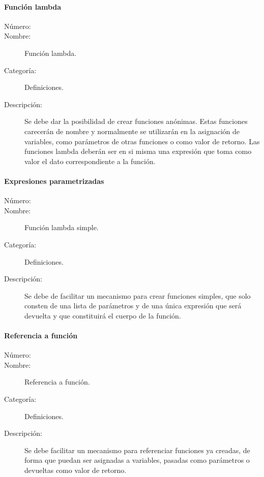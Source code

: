 \paragraph{Función lambda}
	\begin{description}
		\item [Número:] \cn
		\item [Nombre:] Función lambda.
		\item [Categoría:] Definiciones.
		\item [Descripción:] Se debe dar la posibilidad de crear funciones anónimas. Estas funciones carecerán de nombre y 
		normalmente se utilizarán en la asignación de variables, como parámetros de otras funciones o como valor de retorno. 
		Las funciones lambda deberán ser en si misma una expresión que toma como valor el dato correspondiente a la función. 
	\end{description}

\paragraph{Expresiones parametrizadas}
	\begin{description}
		\item [Número:] \cn
		\item [Nombre:] Función lambda simple.
		\item [Categoría:] Definiciones.
		\item [Descripción:] Se debe de facilitar un mecanismo para crear funciones simples, que solo consten de una lista de parámetros
		y de una única expresión que será devuelta y que constituirá el cuerpo de la función. 
	\end{description}

\paragraph{Referencia a función}
	\begin{description}
		\item [Número:] \cn
		\item [Nombre:] Referencia a función.
		\item [Categoría:] Definiciones.
		\item [Descripción:] Se debe facilitar un mecanismo para referenciar funciones ya creadas, de forma que puedan ser asignadas a variables, 
		pasadas como parámetros o devueltas como valor de retorno. 
	\end{description}

